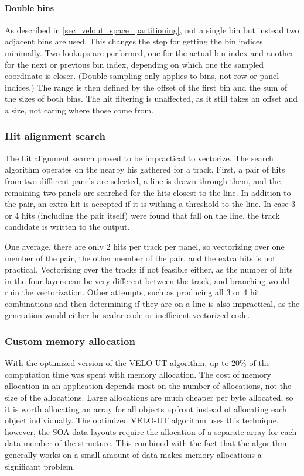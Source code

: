 \documentclass[12pt]{article}
\begin{document}
\paragraph{Double bins}\mbox{}\vspace{0.4pc}

As described in \ref{sec_velout_space_partitioning}, not a single bin but instead two adjacent bins are used. This changes the step for getting the bin indices minimally. Two lookups are performed, one for the actual bin index and another for the next or previous bin index, depending on which one the sampled coordinate is closer. (Double sampling only applies to bins, not row or panel indices.) The range is then defined by the offset of the first bin and the sum of the sizes of both bins. The hit filtering is unaffected, as it still takes an offset and a size, not caring where those come from.


\subsubsection{Hit alignment search}

The hit alignment search proved to be impractical to vectorize. The search algorithm operates on the nearby his gathered for a track. First, a pair of hits from two different panels are selected, a line is drawn through them, and the remaining two panels are searched for the hits closest to the line. In addition to the pair, an extra hit is accepted if it is withing a threshold to the line. In case 3 or 4 hits (including the pair itself) were found that fall on the line, the track candidate is written to the output.

One average, there are only 2 hits per track per panel, so vectorizing over one member of the pair, the other member of the pair, and the extra hits is not practical. Vectorizing over the tracks if not feasible either, as the number of hits in the four layers can be very different between the track, and branching would ruin the vectorization. Other attempts, such as producing all 3 or 4 hit combinations and then determining if they are on a line is also impractical, as the generation would either be scalar code or inefficient vectorized code.


\subsubsection{Custom memory allocation} \label{sec_velout_stack_alloc}

With the optimized version of the VELO-UT algorithm, up to 20\% of the computation time was spent with memory allocation. The cost of memory allocation in an application depends most on the number of allocations, not the size of the allocations. Large allocations are much cheaper per byte allocated, so it is worth allocating an array for all objects upfront instead of allocating each object individually. The optimized VELO-UT algorithm uses this technique, however, the SOA data layouts require the allocation of a separate array for each data member of the structure. This combined with the fact that the algorithm generally works on a small amount of data makes memory allocations a significant problem.
\end{document}
